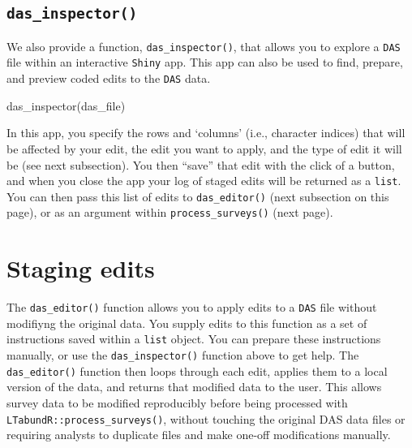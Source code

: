 \documentclass[
]{book}
\newenvironment{Shaded}{\begin{snugshade}}{\end{snugshade}}
\newcommand{\FunctionTok}[1]{\textcolor[rgb]{0.00,0.00,0.00}{#1}}
\newcommand{\NormalTok}[1]{#1}
\begin{document}
\hypertarget{das_inspector}{%
\subsection*{\texorpdfstring{\texttt{das\_inspector()}}{das\_inspector()}}\label{das_inspector}}

We also provide a function, \texttt{das\_inspector()}, that allows you to explore a \texttt{DAS} file within an interactive \texttt{Shiny} app. This app can also be used to find, prepare, and preview coded edits to the \texttt{DAS} data.

\begin{Shaded}
\begin{Highlighting}[]
\FunctionTok{das\_inspector}\NormalTok{(das\_file)}
\end{Highlighting}
\end{Shaded}

In this app, you specify the rows and `columns' (i.e., character indices) that will be affected by your edit, the edit you want to apply, and the type of edit it will be (see next subsection). You then ``save'' that edit with the click of a button, and when you close the app your log of staged edits will be returned as a \texttt{list}. You can then pass this list of edits to \texttt{das\_editor()} (next subsection on this page), or as an argument within \texttt{process\_surveys()} (next page).

\hypertarget{staging-edits}{%
\section*{Staging edits}\label{staging-edits}}

The \texttt{das\_editor()} function allows you to apply edits to a \texttt{DAS} file without modifiyng the original data. You supply edits to this function as a set of instructions saved within a \texttt{list} object. You can prepare these instructions manually, or use the \texttt{das\_inspector()} function above to get help. The \texttt{das\_editor()} function then loops through each edit, applies them to a local version of the data, and returns that modified data to the user. This allows survey data to be modified reproducibly before being processed with \texttt{LTabundR::process\_surveys()}, without touching the original DAS data files or requiring analysts to duplicate files and make one-off modifications manually.
\end{document}
